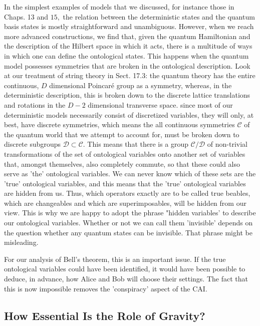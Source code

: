 \documentclass[main.tex]{subfiles}
\begin{document}
In the simplest examples of models that we discussed, for instance those in Chaps. 13 and $15,$ the relation between the deterministic states and the quantum basis states is mostly straightforward and unambiguous. However, when we reach more advanced constructions, we find that, given the quantum Hamiltonian and the description of the Hilbert space in which it acts, there is a multitude of ways in which one can define the ontological states. This happens when the quantum model possesses symmetries that are broken in the ontological description. Look at our treatment of string theory in Sect. 17.3: the quantum theory has the entire continuous, $D$ dimensional Poincaré group as a symmetry, whereas, in the deterministic description, this is broken down to the discrete lattice translations and rotations in the $D-2$ dimensional transverse space. since most of our deterministic models necessarily consist of discretized variables, they will only, at best, have discrete symmetries, which means the all continuous symmetries $\mathcal{C}$ of the quantum world that we attempt to account for, must be broken down to discrete subgroups $\mathcal{D} \subset \mathcal{C} .$ This means that there is a group $\mathcal{C} / \mathcal{D}$ of non-trivial transformations of the set of ontological variables onto another set of variables that, amongst themselves, also completely commute, so that these could also serve as 'the' ontological variables. We can never know which of these sets are the 'true' ontological variables, and this means that the 'true' ontological variables are hidden from us. Thus, which operators exactly are to be called true beables, which are changeables and which are superimposables, will be hidden from our view. This is why we are happy to adopt the phrase "hidden variables' to describe our ontological variables. Whether or not we can call them 'invisible' depends on the question whether any quantum states can be invisible. That phrase might be misleading.

For our analysis of Bell's theorem, this is an important issue. If the true ontological variables could have been identified, it would have been possible to deduce, in advance, how Alice and Bob will choose their settings. The fact that this is now impossible removes the 'conspiracy' aspect of the CAI.




\subsection{How Essential Is the Role of Gravity?}\label{ch22.4}
\end{document}
